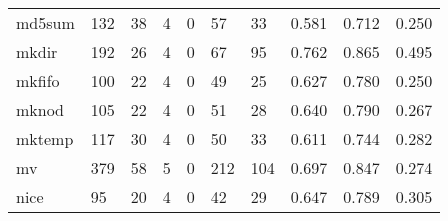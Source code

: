 \begin{longtable}{lp{1.3cm}p{1.3cm}p{1.3cm}p{1.3cm}p{1.3cm}p{1.3cm}p{1.3cm}p{1.3cm}p{1.3cm}}
md5sum    &                    132 &                                 38 &                                 4 &                                0 &                                57 &                              33 &                                0.581 &                                  0.712 &                                0.250 \\
mkdir     &                    192 &                                 26 &                                 4 &                                0 &                                67 &                              95 &                                0.762 &                                  0.865 &                                0.495 \\
mkfifo    &                    100 &                                 22 &                                 4 &                                0 &                                49 &                              25 &                                0.627 &                                  0.780 &                                0.250 \\
mknod     &                    105 &                                 22 &                                 4 &                                0 &                                51 &                              28 &                                0.640 &                                  0.790 &                                0.267 \\
mktemp    &                    117 &                                 30 &                                 4 &                                0 &                                50 &                              33 &                                0.611 &                                  0.744 &                                0.282 \\
mv        &                    379 &                                 58 &                                 5 &                                0 &                               212 &                             104 &                                0.697 &                                  0.847 &                                0.274 \\
nice      &                     95 &                                 20 &                                 4 &                                0 &                                42 &                              29 &                                0.647 &                                  0.789 &                                0.305 \\

\end{longtable}
